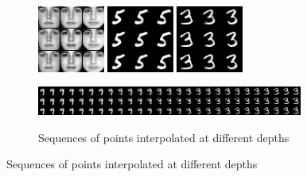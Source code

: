 \begin{figure}
\begin{subfigure}{1.\textwidth}
    \includegraphics[width=0.24\textwidth]{article3/images/1interpolationtfdfold1_rbm2_samples2data_image_noncen.png}
    \includegraphics[width=0.24\textwidth]{article3/images/1interpolationmnist28_cae2_samples28data_image_noncen.png}
    \includegraphics[width=0.24\textwidth]{article3/images/1interpolationmnist28_rbm2_samples16data_image_noncen.png}
\end{subfigure}

\begin{subfigure}{1.\textwidth}
\caption[Sequences of points interpolated at different depths]{Sequences of points interpolated at different depths}
    \includegraphics[width=0.96\textwidth]{article3/images/sequenceinterpolation46_data_image_noncen.png}
    \label{fig:seqinterpol}
\end{subfigure}


\end{figure}
